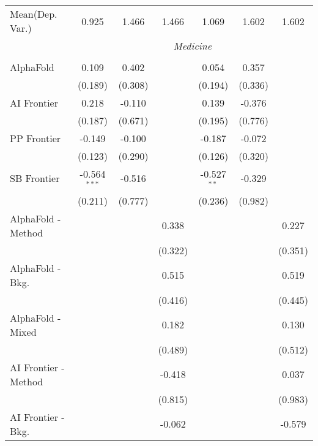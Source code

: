 \begin{tabular}{lcccccc}
Mean(Dep. Var.) & 0.925 & 1.466 & 1.466 & 1.069 & 1.602 & 1.602 \\
 & \multicolumn{6}{c}{\textit{Medicine}} \\ \\
   AlphaFold            & 0.109          & 0.402   &            & 0.054         & 0.357   &   \\   
                        & (0.189)        & (0.308) &            & (0.194)       & (0.336) &   \\   
   AI Frontier          & 0.218          & -0.110  &            & 0.139         & -0.376  &   \\   
                        & (0.187)        & (0.671) &            & (0.195)       & (0.776) &   \\   
   PP Frontier          & -0.149         & -0.100  &            & -0.187        & -0.072  &   \\   
                        & (0.123)        & (0.290) &            & (0.126)       & (0.320) &   \\   
   SB Frontier          & -0.564$^{***}$ & -0.516  &            & -0.527$^{**}$ & -0.329  &   \\   
                        & (0.211)        & (0.777) &            & (0.236)       & (0.982) &   \\   
   AlphaFold - Method   &                &         & 0.338      &               &         & 0.227\\   
                        &                &         & (0.322)    &               &         & (0.351)\\   
   AlphaFold - Bkg.     &                &         & 0.515      &               &         & 0.519\\   
                        &                &         & (0.416)    &               &         & (0.445)\\   
   AlphaFold - Mixed    &                &         & 0.182      &               &         & 0.130\\   
                        &                &         & (0.489)    &               &         & (0.512)\\   
   AI Frontier - Method &                &         & -0.418     &               &         & 0.037\\   
                        &                &         & (0.815)    &               &         & (0.983)\\   
   AI Frontier - Bkg.   &                &         & -0.062     &               &         & -0.579\\   

\end{tabular}
